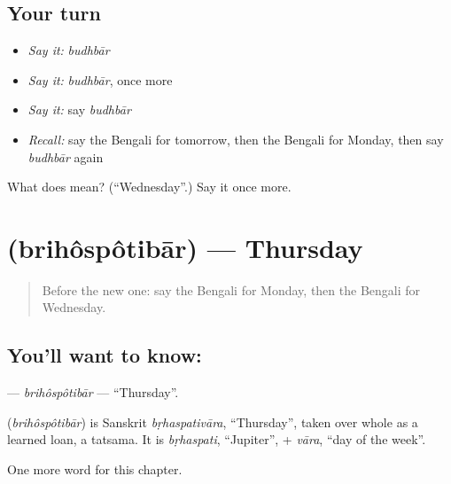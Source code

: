 \subsection*{Your turn}
\begin{itemize}
\raggedright
  \item \emph{Say it:} \emph{budhbār}
  \item \emph{Say it:} \emph{budhbār}, once more
  \item \emph{Say it:} say \emph{budhbār}
  \item \emph{Recall:} say the Bengali for tomorrow, then the Bengali for Monday, then say \emph{budhbār} again
\end{itemize}

\begin{tcolorbox}[breakable,colback=teal!4,colframe=teal!35!black,title={Before you move on}]
What does  mean? (\textquotedblleft{}Wednesday\textquotedblright{}.) Say it once more.
\end{tcolorbox}
\section[\texorpdfstring{\bn{বৃহস্পতিবার} (brihôspôtibār)}{বৃহস্পতিবার (brihôspôtibār)}]{ (brihôspôtibār) — Thursday}

\label{lesson:BN-C91-brihospotibar}



\begin{quote}
Before the new one: say the Bengali for Monday, then the Bengali for Wednesday.
\end{quote}

\subsection*{You'll want to know: }
\textbf{} — \emph{brihôspôtibār} — \textquotedblleft{}Thursday\textquotedblright{}.

\begin{cousinweb}
\textbf{} (\emph{brihôspôtibār}) is Sanskrit \emph{bṛhaspativāra}, \textquotedblleft{}Thursday\textquotedblright{}, taken over whole as a learned loan, a tatsama. It is \emph{bṛhaspati}, \textquotedblleft{}Jupiter\textquotedblright{}, + \emph{vāra}, \textquotedblleft{}day of the week\textquotedblright{}.
\end{cousinweb}

\begin{grammarlens}[title={What you've built}]
One more word for this chapter.
\end{grammarlens}

